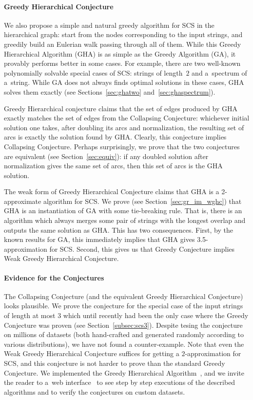 \paragraph{Greedy Hierarchical Conjecture}
We also propose a simple and natural greedy algorithm for SCS in the hierarchical graph: start from the nodes corresponding to the input strings, and greedily build an Eulerian walk passing through all of them. 
While this Greedy Hierarchical Algorithm (GHA) is as simple as the Greedy Algorithm (GA), it provably performs better in some cases. For example, there are two well-known polynomially solvable special cases of SCS: strings of length~$2$ and
a~spectrum of a~string. While GA does not always finds optimal solutions in these cases, GHA solves them exactly (see Sections~\ref{sec:ghatwo} and~\ref{sec:ghaspectrum}).

Greedy Hierarchical conjecture claims that the set of edges produced by GHA exactly matches the set of edges from the Collapsing Conjecture: whichever initial solution one takes, after doubling its arcs and normalization, the resulting set of arcs is exactly the solution found by GHA. Clearly, this conjecture implies Collapsing Conjecture. Perhaps surprisingly, we prove that the two conjectures are equivalent (see Section~\ref{sec:equiv}): if any doubled solution after normalization gives the same set of arcs, then this set of arcs is the GHA solution.

The weak form of Greedy Hierarchical Conjecture claims that GHA is a 2-approximate algorithm for SCS. 
We prove (see Section~\ref{sec:gr_im_wghc}) that GHA is an instantiation of GA with some tie-breaking rule. That is, there is an algorithm which always merges some pair of strings with the longest overlap and outputs the same solution as GHA. This has two consequences. First, by the known results for GA, this immediately implies that GHA gives 3.5-approximation for SCS. Second, this gives us that Greedy Conjecture implies Weak Greedy Hierarchical Conjecture. 

\paragraph{Evidence for the Conjectures}
The Collapsing Conjecture (and the equivalent Greedy Hierarchical Conjecture) looks plausible. We prove the conjecture for the special case of the input strings of length at most $3$ which until recently had been the only case where the Greedy Conjecture was proven (see Section~\ref{subsec:scs3}). Despite tesing the conjecture on millions of datasets (both hand-crafted and generated randomly according to various distributions), we have not found a counter-example. Note that even the Weak Greedy Hierarchical Conjecture suffices for getting a $2$-approximation for SCS, and this conjecture is not harder to prove than the standard Greedy Conjecture.
We implemented the Greedy Hierarchical Algorithm~\cite{github}, and we invite the reader to a~web interface~\cite{webpage} to see step by step executions of the described algorithms and to verify the conjectures on
custom datasets.



